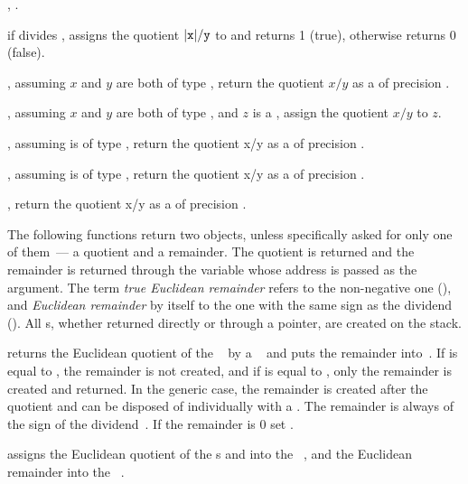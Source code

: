 ,
.

 if  divides , assigns
the quotient $|{\tt x}|/{\tt y}$ to  and returns 1 (true), otherwise
returns 0 (false).


, assuming $x$ and $y$
are both of type , return the quotient $x/y$ as a  of
precision .

, assuming $x$ and $y$
are both of type , and $z$ is a ,
assign the quotient $x/y$ to $z$.

, assuming 
is of type , return the quotient x/y as a  of
precision .

, assuming 
is of type , return the quotient x/y as a  of
precision .

, return the quotient x/y as a
 of precision .


 The following functions return two objects,
unless specifically asked for only one of them~--- a quotient and a remainder.
The quotient is returned and the remainder is returned through the variable
whose address is passed as the  argument. The term \emph{true
Euclidean remainder} refers to the non-negative one (), and
\emph{Euclidean remainder} by itself to the one with the same sign as the
dividend (). All s, whether returned directly or through a
pointer, are created on the stack.

 returns the Euclidean quotient of the
~ by a ~ and puts the remainder
into~. If  is equal to , the remainder is not
created, and if  is equal to  , only the remainder is
created and returned. In the generic case, the remainder is created after the
quotient and can be disposed of individually with a . The
remainder is always of the sign of the dividend~. If the remainder
is $0$ set .

 assigns the Euclidean
quotient of the s  and  into the ~,
and the Euclidean remainder into the ~.

